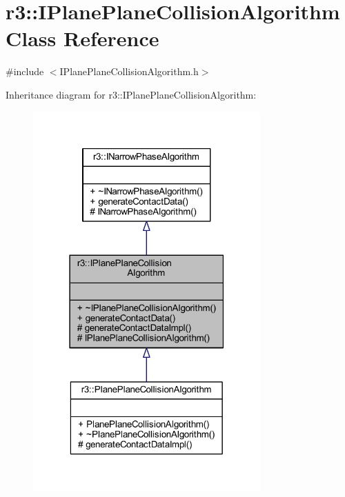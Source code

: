 \hypertarget{classr3_1_1_i_plane_plane_collision_algorithm}{}\section{r3\+:\+:I\+Plane\+Plane\+Collision\+Algorithm Class Reference}
\label{classr3_1_1_i_plane_plane_collision_algorithm}


{\ttfamily \#include $<$I\+Plane\+Plane\+Collision\+Algorithm.\+h$>$}



Inheritance diagram for r3\+:\+:I\+Plane\+Plane\+Collision\+Algorithm\+:\nopagebreak
\begin{figure}[H]
\begin{center}
\leavevmode
\includegraphics[width=247pt]{classr3_1_1_i_plane_plane_collision_algorithm__inherit__graph}
\end{center}
\end{figure}



